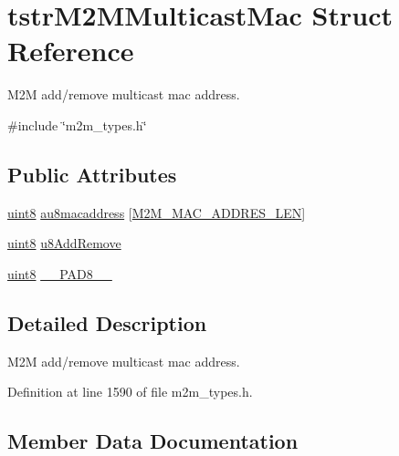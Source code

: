 \hypertarget{structtstrM2MMulticastMac}{}\section{tstr\+M2\+M\+Multicast\+Mac Struct Reference}
\label{structtstrM2MMulticastMac}


M2M add/remove multicast mac address.  




{\ttfamily \#include \char`\"{}m2m\+\_\+types.\+h\char`\"{}}

\subsection*{Public Attributes}
\begin{DoxyCompactItemize}
\item 
\hyperlink{group__DataT_ga4df709a77647e870bbf1d955b8edc9a6}{uint8} \hyperlink{structtstrM2MMulticastMac_a2900231a97d20539732b89c067a8c326}{au8macaddress} \mbox{[}\hyperlink{group__WlanDefines_ga6884f9d5fed2dd058a1bbf4358b5c263}{M2\+M\+\_\+\+M\+A\+C\+\_\+\+A\+D\+D\+R\+E\+S\+\_\+\+L\+EN}\mbox{]}
\item 
\hyperlink{group__DataT_ga4df709a77647e870bbf1d955b8edc9a6}{uint8} \hyperlink{structtstrM2MMulticastMac_ad6ef3a36899b8c5d8c1a9bb0f023aa5c}{u8\+Add\+Remove}
\item 
\hyperlink{group__DataT_ga4df709a77647e870bbf1d955b8edc9a6}{uint8} \hyperlink{structtstrM2MMulticastMac_ab980e461aadcfcb7973d40cf3d27062a}{\+\_\+\+\_\+\+P\+A\+D8\+\_\+\+\_\+}
\end{DoxyCompactItemize}


\subsection{Detailed Description}
M2M add/remove multicast mac address. 

Definition at line 1590 of file m2m\+\_\+types.\+h.



\subsection{Member Data Documentation}
\mbox{\label{structtstrM2MMulticastMac_ab980e461aadcfcb7973d40cf3d27062a}} 
